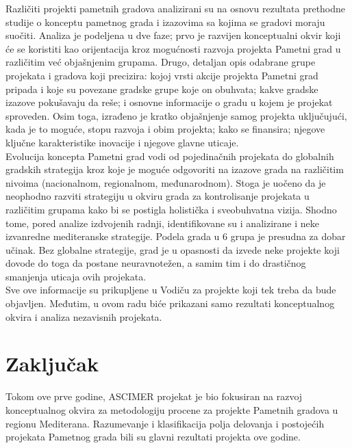 \documentclass[a4paper,12pt]{article}
\begin{document}
{Različiti projekti pametnih gradova analizirani su na osnovu rezultata prethodne studije o konceptu pametnog grada i izazovima sa kojima se gradovi moraju suočiti. Analiza je podeljena u dve faze; prvo je razvijen konceptualni okvir koji će se koristiti kao orijentacija kroz mogućnosti razvoja projekta Pametni grad u različitim već objašnjenim grupama. Drugo, detaljan opis odabrane grupe projekata i gradova koji precizira: kojoj vrsti akcije projekta Pametni grad pripada i koje su povezane gradske grupe koje on obuhvata; kakve gradske izazove pokušavaju da reše; i osnovne informacije o gradu u kojem je projekat sproveden. Osim toga, izrađeno je kratko objašnjenje samog projekta uključujući, kada je to moguće, stopu razvoja i obim projekta; kako se finansira; njegove ključne karakteristike inovacije i njegove glavne uticaje. \\

Evolucija koncepta Pametni grad vodi od pojedinačnih projekata do globalnih gradskih strategija kroz koje je moguće odgovoriti na izazove grada na različitim nivoima (nacionalnom, regionalnom, međunarodnom). Stoga je uočeno da je neophodno razviti strategiju u okviru grada za kontrolisanje projekata u različitim grupama kako bi se postigla holistička i sveobuhvatna vizija. Shodno tome, pored analize izdvojenih radnji, identifikovane su i analizirane i neke izvanredne mediteranske strategije. Podela grada u 6 grupa je presudna za dobar učinak. Bez globalne strategije, grad je u opasnosti da izvede neke projekte koji dovode do toga da postane neuravnotežen, a samim tim i do drastičnog smanjenja uticaja ovih projekata. \\

Sve ove informacije su prikupljene u Vodiču za projekte koji tek treba da bude objavljen. Međutim, u ovom radu biće prikazani samo rezultati konceptualnog okvira i analiza nezavisnih projekata.\\




\section{Zaključak}
\label{sec:zakljucak}
Tokom ove prve godine, ASCIMER projekat je bio fokusiran na razvoj konceptualnog okvira za metodologiju procene za projekte Pametnih gradova u regionu Mediterana. Razumevanje i klasifikacija polja delovanja i postojećih projekata Pametnog grada bili su glavni rezultati projekta ove godine. \\

}
\end{document}
